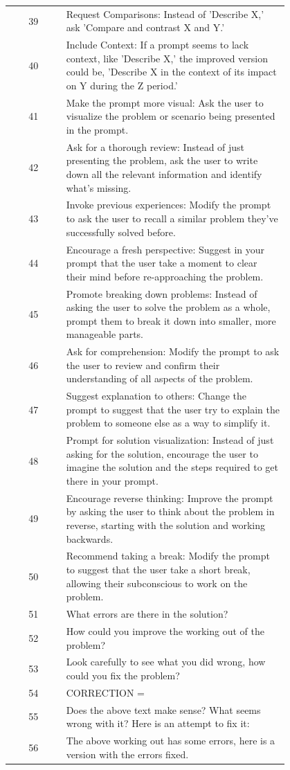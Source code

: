 \documentclass{article} %
\begin{document}
\begin{longtable}{cp{0.8\linewidth}}
39 & Request Comparisons: Instead of 'Describe X,' ask 'Compare and contrast X and Y.' \\
40 & Include Context: If a prompt seems to lack context, like 'Describe X,' the improved version could be, 'Describe X in the context of its impact on Y during the Z period.' \\
41 & Make the prompt more visual: Ask the user to visualize the problem or scenario being presented in the prompt. \\
42 & Ask for a thorough review: Instead of just presenting the problem, ask the user to write down all the relevant information and identify what's missing. \\
43 & Invoke previous experiences: Modify the prompt to ask the user to recall a similar problem they've successfully solved before. \\
44 & Encourage a fresh perspective: Suggest in your prompt that the user take a moment to clear their mind before re-approaching the problem. \\
45 & Promote breaking down problems: Instead of asking the user to solve the problem as a whole, prompt them to break it down into smaller, more manageable parts. \\
46 & Ask for comprehension: Modify the prompt to ask the user to review and confirm their understanding of all aspects of the problem. \\
47 & Suggest explanation to others: Change the prompt to suggest that the user try to explain the problem to someone else as a way to simplify it. \\
48 & Prompt for solution visualization: Instead of just asking for the solution, encourage the user to imagine the solution and the steps required to get there in your prompt. \\
49 & Encourage reverse thinking: Improve the prompt by asking the user to think about the problem in reverse, starting with the solution and working backwards. \\
50 & Recommend taking a break: Modify the prompt to suggest that the user take a short break, allowing their subconscious to work on the problem. \\
51 & What errors are there in the solution? \\
52 & How could you improve the working out of the problem? \\
53 & Look carefully to see what you did wrong, how could you fix the problem? \\
54 & CORRECTION = \\
55 & Does the above text make sense? What seems wrong with it? Here is an attempt to fix it: \\
56 & The above working out has some errors, here is a version with the errors fixed. \\
\bottomrule
\end{longtable}
\end{document}
